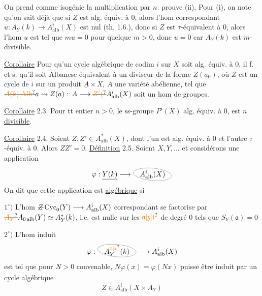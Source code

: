 On prend comme isogénie la multiplication par $n$.
 prouve (ii). Pour (i), on note qu'on sait
déjà que si $Z$ est alg. équiv. à 0, alors
l'hom correspondant $u:A_Y(k)\longrightarrow A^i_{\mathrm{alb}}(X)$ est nul
(th. 1.6.), donc si $Z$ est $\tau$-équivalent à 0, alors
l'hom $u$ est tel que $mu=0$ pour quelque
$m>0$, donc $u=0$ car $A_Y(k)$ est $m$-divisible.

\uline{Corollaire}  Pour qu'un cycle algébrique
de codim $i$ sur $X$ soit alg. équiv. à 0, il
f. et s. qu'il soit Albanese-équivalent à
un diviseur de la forme $Z(a_0)$, où
 $Z$ est un cycle de  $i$
sur un  produit $\underline{A}\times X$, $A$ une
variété abélienne, tel que $\deleted{\unsure{A(k)|\mathrm{Alb}}}a\leadsto Z(a):$
$A\longrightarrow\deleted{\unsure{Z^i(}}A^i_{\mathrm{alb}}(X)$ soit un hom de
groupes.

\uline{Corollaire} 2.3. Pour tt entier $n>0$, le ss-groupe
$P^i(X)$   
alg. équiv. à 0, est $n$ \uline{divisible}.

\uline{Corollaire} 2.4. Soient $Z,Z'\in A^*_{\mathrm{alb}}(X)$, dont l'un est
alg. équiv. à 0 et l'autre $\tau$-équiv. à 0.
Alors $ZZ'=0$.
\uline{Définition} 2.5. Soient $X,Y,\ldots$ et considérons une
application
\[
\varphi:\underline{Y(k)}\longrightarrow \tikz[baseline=(terme.base)]{\node[inner sep=1pt] (terme) {$A^i_{\mathrm{alb}}(X)$};\draw[gray,thin,rotate around={-5:(terme.center)}] (terme.center) ellipse (2.7em and .85em);}
\]
On dit que cette application est \uline{algébrique} si

$1^\circ)$ L'hom $\deleted{Z}\operatorname{Cyc}_0(Y)\longrightarrow A^i_{\mathrm{alb}}(X)$
correspondant se factorise par
$\deleted{\unsure{A_Y}}A_{0\,\mathrm{alb}}(Y)\simeq A_Y^*(k)$, i.e.  est
nulle sur les $\unsure{\mathfrak{a}|\mathfrak{z}|\mathfrak{t}}$ de degré 0 tels
que $S_Y(\mathfrak{a})=0$

$2^\circ)$ L'hom induit
\[
\varphi:\tikz[baseline=(terme.base)]{\node[inner sep=1pt] (terme) {$A_Y^{\unsure{0|*}}(k)$};\draw[gray,thin,rotate around={-5:(terme.center)}] (terme.center) ellipse (2.7em and .85em);}\longrightarrow A^i_{\mathrm{alb}}(X)
\]
est tel que pour $N>0$ convenable, $\underline{N\varphi}(x)=\varphi(Nx)$
puisse être induit par un cycle algébrique
\[
Z\in A^i_{\mathrm{alb}}(X\times A_Y)
\]

